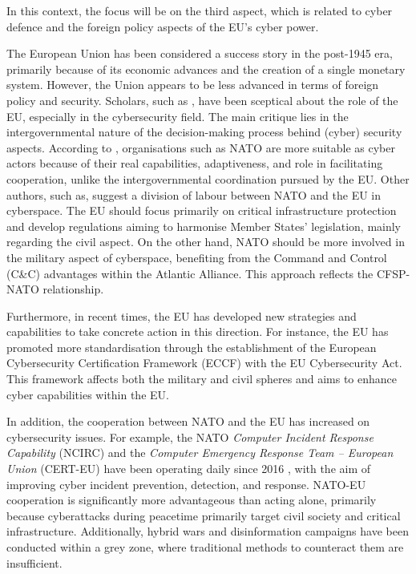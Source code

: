 In this context, the focus will be on the third aspect, which is related to cyber defence and the foreign policy aspects of the EU's cyber power.

The European Union has been considered a success story in the post-1945 era, primarily because of its economic advances and the creation of a single monetary system. However, the Union appears to be less advanced in terms of foreign policy and security. Scholars, such as \textcite{sliwinski_2014_moving}, have been sceptical about the role of the EU, especially in the cybersecurity field. The main critique lies in the intergovernmental nature of the decision-making process behind (cyber) security aspects. According to \textcite{sliwinski_2014_moving}, organisations such as NATO are more suitable as cyber actors because of their real capabilities, adaptiveness, and role in facilitating cooperation, unlike the intergovernmental coordination pursued by the EU. Other authors, such as, \textcite{klimburg_2011_cybersecurity} suggest a division of labour between NATO and the EU in cyberspace. The EU should focus primarily on critical infrastructure protection and develop regulations aiming to harmonise Member States' legislation, mainly regarding the civil aspect. On the other hand, NATO should be more involved in the military aspect of cyberspace, benefiting from the Command and Control (C\&C) advantages within the Atlantic Alliance. This approach reflects the CFSP-NATO relationship.

Furthermore, in recent times, the EU has developed new strategies and capabilities to take concrete action in this direction. For instance, the EU has promoted more standardisation through the establishment of the European Cybersecurity Certification Framework (ECCF) with the EU Cybersecurity Act. This framework affects both the military and civil spheres and aims to enhance cyber capabilities within the EU.

In addition, the cooperation between NATO and the EU has increased on cybersecurity issues. For example, the NATO\textit{ Computer Incident Response Capability} (NCIRC) and the \textit{Computer Emergency Response Team – European Union} (CERT-EU) have been operating daily since 2016 \autocite{eeas_2016_eu}, with the aim of improving cyber incident prevention, detection, and response. NATO-EU cooperation is significantly more advantageous than acting alone, primarily because cyberattacks during peacetime primarily target civil society and critical infrastructure. Additionally, hybrid wars and disinformation campaigns have been conducted within a grey zone, where traditional methods to counteract them are insufficient.

